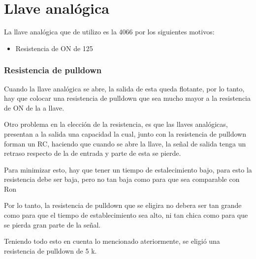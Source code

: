 \documentclass[../../ASSD_TP1_G7.tex]{subfiles}
\begin{document}
\chapter*{Llave anal\'ogica}
La llave anal\'ogica que de utilizo es la 4066 por los siguientes motivos:
\begin{itemize}
\item Resistencia de ON de 125 \Omega
\end{itemize}

\subsection*{Resistencia de pulldown}
Cuando la llave analógica se abre, la salida de esta queda flotante, por lo tanto, hay que colocar una resistencia de pulldown que sea mucho mayor a la resistencia de ON de la a llave.

Otro problema en la elección de la resistencia, es que las llaves anal\'ogicas, presentan a la salida una capacidad la cual, junto con la resistencia de pulldown forman un RC, haciendo que cuando se abre la llave, la se\~nal de salida tenga un retraso respecto de la de entrada y parte de esta se pierde.

Para minimizar esto, hay que tener un tiempo de estalecimiento bajo, para esto la resistencia debe ser baja, pero no tan baja como para que sea comparable con Ron

Por lo tanto, la resistencia de pulldown que se eligira no debera ser tan grande como para que el tiempo de establecimiento sea alto, ni tan chica como para que se pierda gran parte de la señal.

Teniendo todo esto en cuenta lo mencionado ateriormente, se eligió una resistencia de pulldown de 5 k\Omega.
\end{document}
